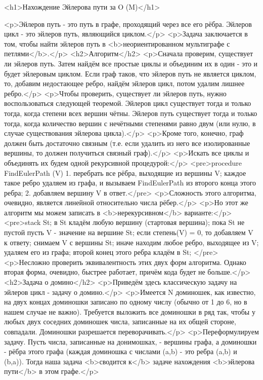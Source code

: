 <h1>Нахождение Эйлерова пути за O (M)</h1>

<p>Эйлеров путь - это путь в графе, проходящий через все его рёбра. Эйлеров цикл - это эйлеров путь, являющийся циклом.</p>
<p>Задача заключается в том, чтобы найти эйлеров путь в <b>неориентированном мультиграфе с петлями</b>.</p>
<h2>Алгоритм</h2>
<p>Сначала проверим, существует ли эйлеров путь. Затем найдём все простые циклы и объединим их в один - это и будет эйлеровым циклом. Если граф таков, что эйлеров путь не является циклом, то, добавим недостающее ребро, найдём эйлеров цикл, потом удалим лишнее ребро.</p>
<p>Чтобы проверить, существует ли эйлеров путь, нужно воспользоваться следующей теоремой. Эйлеров цикл существует тогда и только тогда, когда степени всех вершин чётны. Эйлеров путь существует тогда и только тогда, когда количество вершин с нечётными степенями равно двум (или нулю, в случае существования эйлерова цикла).</p>
<p>Кроме того, конечно, граф должен быть достаточно связным (т.е. если удалить из него все изолированные вершины, то должен получиться связный граф).</p>
<p>Искать все циклы и объединять их будем одной рекурсивной процедурой:</p>
<pre>procedure FindEulerPath (V)
	1. перебрать все рёбра, выходящие из вершины V;
		каждое такое ребро удаляем из графа, и
		вызываем FindEulerPath из второго конца этого ребра;
	2. добавляем вершину V в ответ.</pre>
<p>Сложность этого алгоритма, очевидно, является линейной относительно числа рёбер.</p>
<p>Но этот же алгоритм мы можем записать в <b>нерекурсивном</b> варианте:</p>
<pre>stack St;
в St кладём любую вершину (стартовая вершина);
пока St не пустой
	пусть V - значение на вершине St;
	если степень(V) = 0, то
		добавляем V к ответу;
		снимаем V с вершины St;
	иначе
		находим любое ребро, выходящее из V;
		удаляем его из графа;
		второй конец этого ребра кладём в St;
</pre>
<p>Несложно проверить эквивалентность этих двух форм алгоритма. Однако вторая форма, очевидно, быстрее работает, причём кода будет не больше.</p>
<h2>Задача о домино</h2>
<p>Приведём здесь классическую задачу на эйлеров цикл - задачу о домино.</p>
<p>Имеется N доминошек, как известно, на двух концах доминошки записано по одному числу (обычно от 1 до 6, но в нашем случае не важно). Требуется выложить все доминошки в ряд так, чтобы у любых двух соседних доминошек числа, записанные на их общей стороне, совпадали. Доминошки разрешается переворачивать.</p>
<p>Переформулируем задачу. Пусть числа, записанные на донимошках, - вершины графа, а доминошки - рёбра этого графа (каждая доминошка с числами (a,b) - это ребра (a,b) и (b,a)). Тогда наша задача <b>сводится к</b> задаче нахождения <b>эйлерова пути</b> в этом графе.</p>

